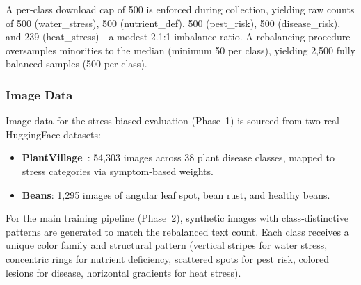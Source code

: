 \documentclass[10pt,journal,compsoc]{IEEEtran}
\begin{document}
A per-class download cap of 500 is enforced during collection, yielding raw counts of 500 (water\_stress), 500 (nutrient\_def), 500 (pest\_risk), 500 (disease\_risk), and 239 (heat\_stress)---a modest 2.1:1 imbalance ratio. A rebalancing procedure oversamples minorities to the median (minimum 50 per class), yielding 2,500 fully balanced samples (500 per class).

\subsubsection{Image Data}
Image data for the stress-biased evaluation (Phase~1) is sourced from two real HuggingFace datasets:
\begin{itemize}[leftmargin=*]
    \item \textbf{PlantVillage}~\cite{mohanty2016using}: 54,303 images across 38 plant disease classes, mapped to stress categories via symptom-based weights.
    \item \textbf{Beans}: 1,295 images of angular leaf spot, bean rust, and healthy beans.
\end{itemize}

For the main training pipeline (Phase~2), synthetic images with class-distinctive patterns are generated to match the rebalanced text count. Each class receives a unique color family and structural pattern (vertical stripes for water stress, concentric rings for nutrient deficiency, scattered spots for pest risk, colored lesions for disease, horizontal gradients for heat stress).

\begin{table}[htbp]
\centering
\caption{Dataset Overview}
\label{tab:dataset_overview}
\small
{}
\end{table}
\end{document}
